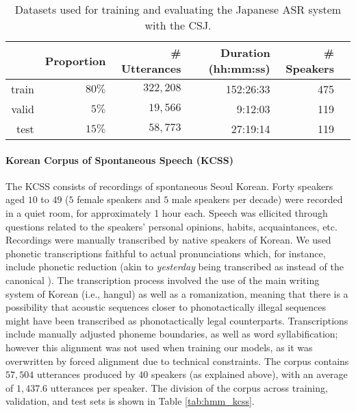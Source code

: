 \begin{table}[htb]
\centering
\caption{Datasets used for training and evaluating the Japanese ASR system with the CSJ.}
\label{tab:hmm_csj}
\vspace{0.25cm}
\begin{tabular}{rrrrrr}
  \toprule
      & Proportion &\# Utterances & Duration (hh:mm:ss) & \# Speakers &  \\ \midrule
  train & $80\%$ &  $322,208$            & 152:26:33     &   475          &  \\
  valid & $5\%$ &  $19,566$         &  9:12:03    &   119          &  \\
  test  & $15\%$ &  $58,773$        &  27:19:14    &  119           & \\ \bottomrule
\end{tabular}
\end{table}

\paragraph{Korean Corpus of Spontaneous Speech (KCSS)}

The KCSS \cite{yun2015} consists of recordings of spontaneous Seoul Korean. Forty speakers aged $10$ to $49$ ($5$ female speakers and $5$ male speakers per decade) were recorded in a quiet room, for approximately 1 hour each. Speech was ellicited through questions related to the speakers' personal opinions, habits, acquaintances, etc.      
Recordings were manually transcribed by native speakers of Korean. We used phonetic transcriptions faithful to actual pronunciations which, for instance, include phonetic reduction (akin to \textit{yesterday} being transcribed as  instead of the canonical ). The transcription process involved the use of the main writing system of Korean (i.e., hangul) as well as a romanization, meaning that there is a possibility that acoustic sequences closer to phonotactically illegal sequences might have been transcribed as phonotactically legal counterparts.   
Transcriptions include manually adjusted phoneme boundaries, as well as word syllabification; however this alignment was not used when training our models, as it was overwritten by forced alignment due to technical constraints.
The corpus contains $57,504$ utterances produced by $40$ speakers (as explained above), with an average of $1,437.6$ utterances per speaker. The division of the corpus across training, validation, and test sets is shown in Table \ref{tab:hmm_kcss}.

